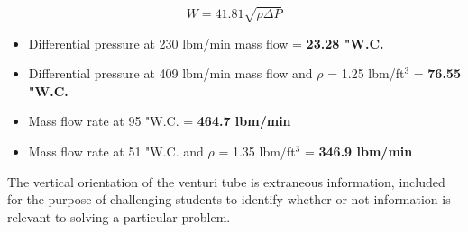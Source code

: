 





$$W = 41.81 \sqrt{\rho \Delta P}$$

\begin{itemize}
\item{} Differential pressure at 230 lbm/min mass flow = {\bf 23.28 "W.C.}
\item{} Differential pressure at 409 lbm/min mass flow and $\rho$ = 1.25 lbm/ft$^{3}$ = {\bf 76.55 "W.C.}
\item{} Mass flow rate at 95 "W.C. = {\bf 464.7 lbm/min}
\item{} Mass flow rate at 51 "W.C. and $\rho$ = 1.35 lbm/ft$^{3}$ = {\bf 346.9 lbm/min} 
\end{itemize}

\vskip 10pt

The vertical orientation of the venturi tube is extraneous information, included for the purpose of challenging students to identify whether or not information is relevant to solving a particular problem.





